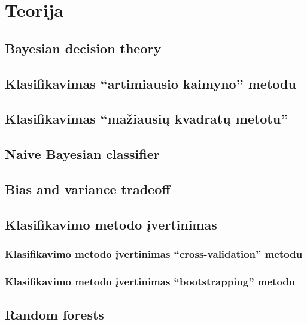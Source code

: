 \documentclass{article}
\begin{document}
\let \savenumberline \numberline
\def \numberline#1{\savenumberline{#1.}}
\tableofcontents

%



\section{Teorija}
\subsection{Bayesian decision theory}
\subsection{Klasifikavimas ``artimiausio kaimyno'' metodu}
\subsection{Klasifikavimas ``mažiausių kvadratų metotu''}
\subsection{Naive Bayesian classifier}
\subsection{Bias and variance tradeoff}
\subsection{Klasifikavimo metodo įvertinimas}
\subsubsection{Klasifikavimo metodo įvertinimas ``cross-validation'' metodu}
\subsubsection{Klasifikavimo metodo įvertinimas ``bootstrapping'' metodu}

\subsection{Random forests}
\end{document}
